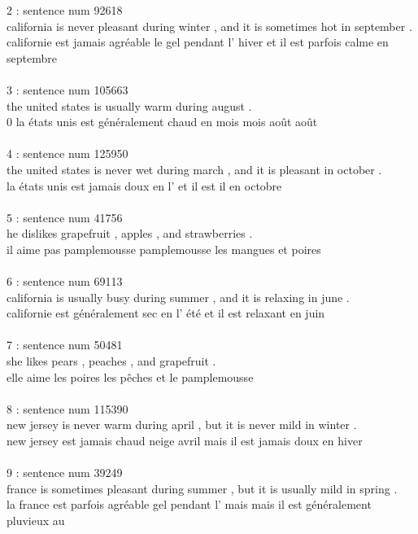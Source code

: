 \documentclass[12pt,oneside,geqno]{article}
\begin{document}
	2 : sentence num 92618\\
	california is never pleasant during winter , and it is sometimes hot in september .\\
	californie est jamais agréable le gel pendant l' hiver et il est parfois calme en septembre \\\\
	
	3 : sentence num 105663\\
	the united states is usually warm during august .\\
	0	la états unis est généralement chaud en mois mois août août \\\\
	
	4 : sentence num 125950\\
	the united states is never wet during march , and it is pleasant in october .\\
	la états unis est jamais doux en l' et il est il en octobre \\\\
	
	5 : sentence num 41756\\
	he dislikes grapefruit , apples , and strawberries .\\
	il aime pas pamplemousse pamplemousse les mangues et poires \\\\
	
	6 : sentence num 69113\\
	california is usually busy during summer , and it is relaxing in june .\\
	californie est généralement sec en l' été et il est relaxant en juin \\\\
	
	7 : sentence num 50481\\
	she likes pears , peaches , and grapefruit .\\
	elle aime les poires les pêches et le pamplemousse \\\\
	
	8 : sentence num 115390\\
	new jersey is never warm during april , but it is never mild in winter .\\
	new jersey est jamais chaud neige avril mais il est jamais doux en hiver \\\\
	
	9 : sentence num 39249\\
	france is sometimes pleasant during summer , but it is usually mild in spring .\\
	la france est parfois agréable gel pendant l' mais mais il est généralement pluvieux au \\\\
	
\end{document}
